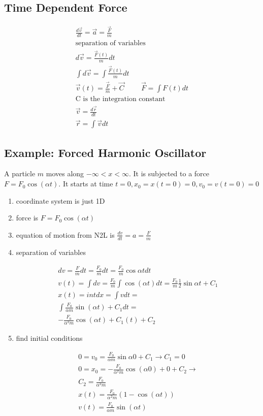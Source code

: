 \documentclass[fleqn]{report}
\newcommand{\hp}{\hspace{1cm}}
\newcommand{\equations} [1] {
\begin{gather*}
#1
\end{gather*}
}
\begin{document}
\subsection{Time Dependent Force}
\equations{
\frac{d \vec v}{dt} = \vec a = \frac{\vec F}{m}
\\
\textrm{separation of variables}
\\
d \vec v = \frac{\vec F(t)}{m} dt 
\\
\int d \vec v = \int \frac{\vec F(t)}{m} dt
\\
\vec v(t) = \frac{\vec F}{m} + \vec C \hp \vec F = \int F(t) dt
\\
\textrm{C is the integration constant}
\\
\vec v = \frac{d \vec r}{dt}
\\
\vec r = \int \vec v dt
}

\subsection{Example: Forced Harmonic Oscillator}
A particle $m$ moves along $-\infty < x <\infty$. It is subjected to a force 
$F = F_0 \cos(\alpha t)$.
It starts at time $t = 0, x_0 = x(t = 0) = 0, v_0 = v(t = 0) = 0$

\begin{enumerate}
\item
coordinate system is just 1D
\item
force is $F = F_0 \cos(\alpha t)$
\item
equation of motion from N2L is $\frac{dv}{dt} = a = \frac{F}{m}$
\item
separation of variables
\equations{
    dv = \frac{F}{m} dt = \frac{F_0}{m} dt = \frac{F_0}{m} \cos{\alpha t} dt
    \\
    v(t) = \int dv = \frac{F_0}{m} \int \cos(\alpha t) dt = 
    \frac{F_0}{m} \frac{1}{2} \sin{\alpha t} + C_1
    \\
    x(t) = int dx = \int v dt =
    \\
    \int \frac{F_0}{\alpha m} \sin(\alpha t) + C_1 dt =
    \\
    - \frac{F_0}{\alpha^2 m} \cos(\alpha t) + C_1(t) + C_2
}
\item
find initial conditions

\equations{
0 = v_0 = \frac{F_0}{\alpha m} \sin{\alpha 0} + C_1 \rightarrow C_1 = 0
\\
0 = x_0 = - \frac{F_0}{\alpha^2 m} \cos(\alpha 0) + 0 + C_2 \rightarrow 
\\
C_2 = \frac{F_0}{\alpha^2 m}
\\
x(t) = \frac{F_0}{\alpha^2 m} \left(1 - \cos(\alpha t) \right)
\\
v(t) = \frac{F_0}{\alpha m} \sin(\alpha t)
}
\end{enumerate}
\end{document}
